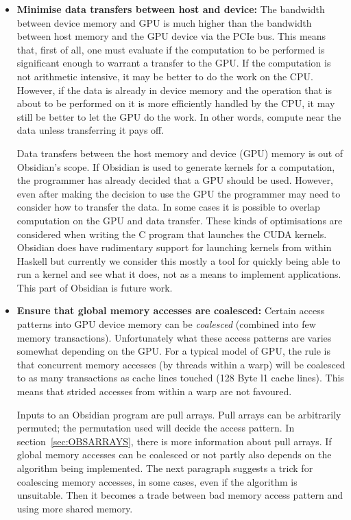 \documentclass[a4paper]{book}
\begin{document}
\begin{itemize} 

\item {\bf Minimise data transfers between host and device:} The bandwidth between device memory 
and GPU is much higher than the bandwidth between host memory and the GPU device via the PCIe bus.
This means that, first of all, one must evaluate if the computation to be performed is significant 
enough to warrant a transfer to the GPU. If the computation is not arithmetic intensive, it may be 
better to do the work on the CPU. However, if the data is already in device memory and 
the operation that is about to be performed on it is more efficiently handled by the CPU, it 
may still be better to let the GPU do the work. In other words, compute near the data unless 
transferring it pays off. 

Data transfers between the host memory and device (GPU) memory is out of Obsidian's scope. 
If Obsidian is used to generate kernels for a computation, the programmer has already decided that 
a GPU should be used. However, even after making the decision to use the GPU the programmer 
may need to consider how to transfer the data. In some cases it is possible to overlap 
computation on the GPU and data transfer. These kinds of optimisations are considered 
when writing the C program that launches the CUDA kernels. Obsidian does have rudimentary 
support for launching kernels from within Haskell but currently we consider this mostly a
tool for quickly being able to run a kernel and see what it does, not as a means to implement 
applications. This part of Obsidian is future work. 

\item {\bf Ensure that global memory accesses are coalesced:} Certain access patterns into 
GPU device memory can be {\em coalesced} (combined into few memory transactions). Unfortunately 
what these access patterns are varies somewhat depending on the GPU. For a typical model of 
GPU, the rule is that concurrent memory accesses (by threads within a warp) will be coalesced 
to as many transactions as cache lines touched (128 Byte l1 cache lines). This means that strided 
accesses from within a warp are not favoured. 

Inputs to an Obsidian program are pull arrays. Pull arrays can be arbitrarily permuted; 
the permutation used will decide the access pattern. In section~\ref{sec:OBSARRAYS}, there 
is more information about pull arrays. If global memory accesses can 
be coalesced or not partly also depends on the algorithm being implemented. The next paragraph 
suggests a trick for coalescing memory accesses, in some cases, even if the algorithm is 
unsuitable. Then it becomes a trade between bad memory access pattern and using more 
shared memory. 


\end{itemize}
\end{document}
